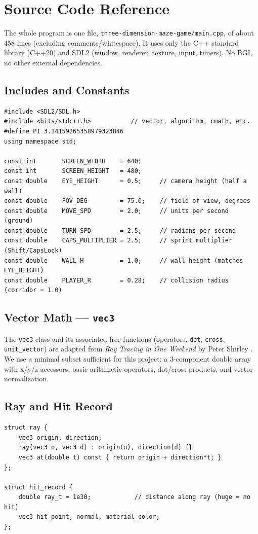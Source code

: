 \chapter{Source Code Reference}

The whole program is one file, \texttt{three-dimension-maze-game/main.cpp}, of about 458 lines (excluding comments/whitespace). It uses only the C++ standard library (C++20) and SDL2 (window, renderer, texture, input, timers). No BGI, no other external dependencies.

\section{Includes and Constants}
\begin{verbatim}
#include <SDL2/SDL.h>
#include <bits/stdc++.h>           // vector, algorithm, cmath, etc.
#define PI 3.14159265358979323846
using namespace std;

const int       SCREEN_WIDTH    = 640;
const int       SCREEN_HEIGHT   = 480;
const double    EYE_HEIGHT      = 0.5;     // camera height (half a wall)
const double    FOV_DEG         = 75.0;    // field of view, degrees
const double    MOVE_SPD        = 2.0;     // units per second (ground)
const double    TURN_SPD        = 2.5;     // radians per second
const double    CAPS_MULTIPLIER = 2.5;     // sprint multiplier (Shift/CapsLock)
const double    WALL_H          = 1.0;     // wall height (matches EYE_HEIGHT)
const double    PLAYER_R        = 0.28;    // collision radius (corridor = 1.0)
\end{verbatim}

\section{Vector Math --- \texttt{vec3}}
The \texttt{vec3} class and its associated free functions (operators, \texttt{dot}, \texttt{cross}, \texttt{unit\_vector}) are adapted from \textit{Ray Tracing in One Weekend} by Peter Shirley \cite{shirley2016ray}. We use a minimal subset sufficient for this project: a 3-component double array with x/y/z accessors, basic arithmetic operators, dot/cross products, and vector normalization.

\section{Ray and Hit Record}
\begin{verbatim}
struct ray {
    vec3 origin, direction;
    ray(vec3 o, vec3 d) : origin(o), direction(d) {}
    vec3 at(double t) const { return origin + direction*t; }
};

struct hit_record {
    double ray_t = 1e30;            // distance along ray (huge = no hit)
    vec3 hit_point, normal, material_color;
};
\end{verbatim}

